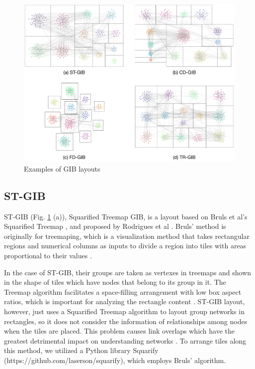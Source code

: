 \documentclass{llncs}
\begin{document}
\begin{figure}[h]
  \begin{center}
    \includegraphics[width=1\textwidth]{example.png}
    \caption{Examples of GIB layouts}
    \label{GIB-examples}
  \end{center}
\end{figure}

\subsection{ST-GIB}
ST-GIB (Fig. \ref{GIB-examples} (a)), Squarified Treemap GIB, is a layout based on Bruls et al's Squarified Treemap \cite{bruls}, and proposed by Rodrigues et al \cite{rodri}.
Bruls' method is originally for treemaping, which is a visualization method that takes rectangular regions and numerical columns as inputs to divide a region into tiles with areas proportional to their values \cite{shn92}.

In the case of ST-GIB, their groups are taken as vertexes in treemaps and shown in the shape of tiles which have nodes that belong to its group in it.
The Treemap algorithm facilitates a space-filling arrangement with low box aspect ratios, which is important for analyzing the rectangle content \cite{bruls}.
ST-GIB layout, however, just uses a Squarified Treemap algorithm to layout group networks in rectangles, so it does not consider the information of relationships among nodes when the tiles are placed.
This problem causes link overlaps which have the greatest detrimental impact on understanding networks \cite{becker,pur97,pur98,pca}.
To arrange tiles along this method, we utilized a Python library Squarify (https://github.com/laserson/squarify), which employs Bruls' algorithm.
\end{document}
